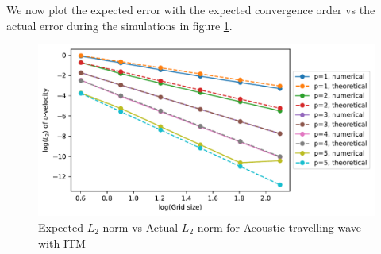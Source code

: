 We now plot the expected error with the expected convergence order vs the actual error during the simulations in figure \ref{fig:expectedvsactualerror}.

\begin{figure}
    \centering
    \includegraphics[width=\linewidth]{figures/error3.pdf}
    \caption{Expected $L_2$ norm vs Actual $L_2$ norm for Acoustic travelling wave with \ac{ITM}}
    \label{fig:expectedvsactualerror}
\end{figure}
